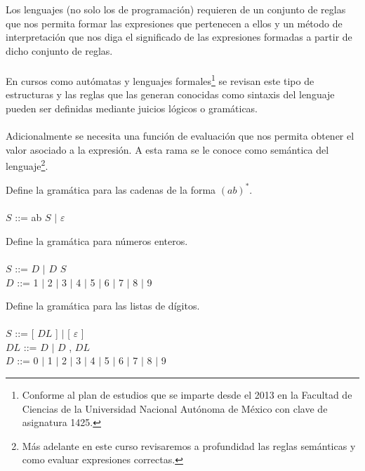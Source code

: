    Los lenguajes (no solo los de programación) requieren de un conjunto de reglas que nos permita formar las expresiones que pertenecen a ellos y un método de interpretación que nos diga el significado de las expresiones formadas a partir de dicho conjunto de reglas.\\\\
    En cursos como autómatas y lenguajes formales\footnote{Conforme al plan de estudios que se imparte desde el 2013 en la Facultad de Ciencias de la Universidad Nacional Autónoma de México con clave de asignatura 1425. } se revisan este tipo de estructuras y las reglas que las generan conocidas como sintaxis del  lenguaje pueden ser definidas mediante juicios lógicos o gramáticas. \\\\
    Adicionalmente se necesita una función de evaluación que nos permita obtener el valor asociado a la expresión. A esta rama se le conoce como semántica del lenguaje\footnote{
    Más adelante en este curso revisaremos a profundidad las reglas semánticas y como evaluar expresiones correctas.}.

    \begin{exercise}
        Define la gramática para las cadenas de la forma $(ab)^*$.     \\\\
            $S$ ::= ab $S$ $|$ $\varepsilon$
    \end{exercise}

    \begin{exercise}
        Define la gramática para números enteros.  \\\\
            $S$ ::= $D$ $|$ $D$ $S$     \\
            $D$ ::= 1 $|$ 2 $|$ 3 $|$ 4 $|$ 5 $|$ 6 $|$ 7 $|$ 8 $|$ 9
    \end{exercise}


    \begin{exercise}
        Define la gramática para las listas de dígitos.     \\\\
            $S$ ::= [ $DL$ ] $|$ [ $\varepsilon$ ]    \\
            $DL$ ::= $D$ $|$ $D$ , $DL$  \\
            $D$ ::= 0 $|$ 1 $|$ 2 $|$ 3 $|$ 4 $|$ 5 $|$ 6 $|$ 7 $|$ 8 $|$ 9
    \end{exercise}

